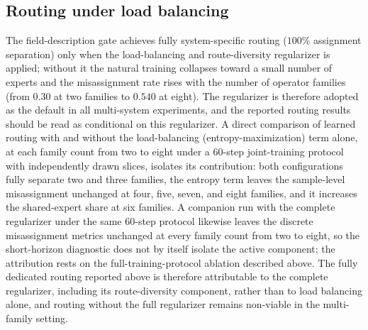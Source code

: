 \documentclass[preprint,12pt]{elsarticle}
\begin{document}
\subsection{Routing under load balancing}
The field-description gate achieves fully system-specific routing ($100\%$ assignment separation)
only when the load-balancing and route-diversity regularizer is applied; without it the natural
training collapses toward a small number of experts and the misassignment rate rises with the number
of operator families (from $0.30$ at two families to $0.540$ at eight). The regularizer is therefore
adopted as the default in all multi-system experiments, and the reported routing results should be
read as conditional on this regularizer. A direct comparison of learned routing with and without the
load-balancing (entropy-maximization) term alone, at each family count from two to eight under a
60-step joint-training protocol with independently drawn slices, isolates its contribution: both
configurations fully separate two and three families, the entropy term leaves the sample-level
misassignment unchanged at four, five, seven, and eight families, and it increases the shared-expert
share at six families. A companion run with the complete regularizer under the same 60-step protocol
likewise leaves the discrete misassignment metrics unchanged at every family count from two to eight,
so the short-horizon diagnostic does not by itself isolate the active component; the attribution
rests on the full-training-protocol ablation described above. The fully dedicated routing reported
above is therefore attributable to the complete regularizer, including its route-diversity component,
rather than to load balancing alone, and routing without the full regularizer remains non-viable in
the multi-family setting.
\end{document}

